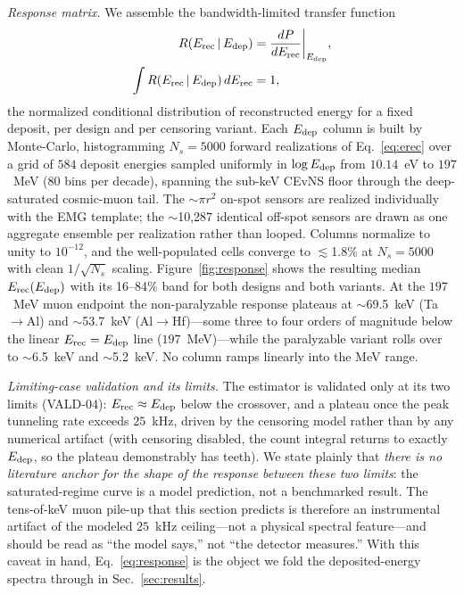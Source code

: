 \emph{Response matrix.} We assemble the bandwidth-limited transfer function
\begin{equation}
\begin{aligned}
R(E_{\rm rec}\,|\,E_{\rm dep})&=\frac{dP}{dE_{\rm rec}}\bigg|_{E_{\rm dep}},\\
\int R(E_{\rm rec}\,|\,E_{\rm dep})\,dE_{\rm rec}&=1,
\end{aligned}
\label{eq:response}
\end{equation}
the normalized conditional distribution of reconstructed energy for a fixed deposit, per design and per censoring variant. Each $E_{\rm dep}$ column is built by Monte-Carlo, histogramming $N_s=5000$ forward realizations of Eq.~\eqref{eq:erec} over a grid of $584$ deposit energies sampled uniformly in $\log E_{\rm dep}$ from $10.14$~eV to $197$~MeV (80 bins per decade), spanning the sub-keV CEvNS floor through the deep-saturated cosmic-muon tail. The $\sim$$\pi r^2$ on-spot sensors are realized individually with the EMG template; the $\sim$10,287 identical off-spot sensors are drawn as one aggregate ensemble per realization rather than looped. Columns normalize to unity to $10^{-12}$, and the well-populated cells converge to $\lesssim$1.8\% at $N_s=5000$ with clean $1/\sqrt{N_s}$ scaling. Figure~\ref{fig:response} shows the resulting median $E_{\rm rec}(E_{\rm dep})$ with its 16--84\% band for both designs and both variants. At the $197$~MeV muon endpoint the non-paralyzable response plateaus at $\sim$69.5~keV (Ta$\to$Al) and $\sim$53.7~keV (Al$\to$Hf)---some three to four orders of magnitude below the linear $E_{\rm rec}=E_{\rm dep}$ line ($197$~MeV)---while the paralyzable variant rolls over to $\sim$6.5~keV and $\sim$5.2~keV. No column ramps linearly into the MeV range.

\emph{Limiting-case validation and its limits.} The estimator is validated only at its two limits (VALD-04): $E_{\rm rec}\approx E_{\rm dep}$ below the crossover, and a plateau once the peak tunneling rate exceeds $25$~kHz, driven by the censoring model rather than by any numerical artifact (with censoring disabled, the count integral returns to exactly $E_{\rm dep}$, so the plateau demonstrably has teeth). We state plainly that \emph{there is no literature anchor for the shape of the response between these two limits}: the saturated-regime curve is a model prediction, not a benchmarked result. The tens-of-keV muon pile-up that this section predicts is therefore an instrumental artifact of the modeled $25$~kHz ceiling---not a physical spectral feature---and should be read as ``the model says,'' not ``the detector measures.'' With this caveat in hand, Eq.~\eqref{eq:response} is the object we fold the deposited-energy spectra through in Sec.~\ref{sec:results}.
